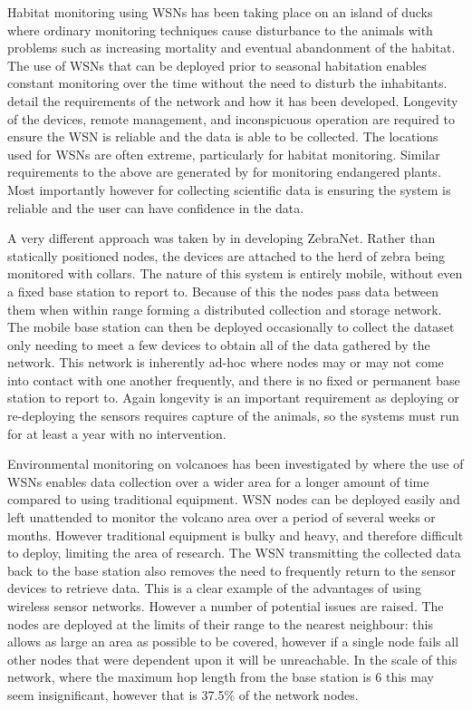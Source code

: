 \documentclass[authoryearcitations]{UoYCSproject}
\begin{document}
Habitat monitoring using WSNs has been taking place on an island of ducks where ordinary monitoring techniques cause disturbance to the animals with problems such as increasing mortality and eventual abandonment of the habitat. The use of WSNs that can be deployed prior to seasonal habitation enables constant monitoring over the time without the need to disturb the inhabitants. \citet{Mainwaring2002} detail the requirements of the network and how it has been developed. Longevity of the devices, remote management, and inconspicuous operation are required to ensure the WSN is reliable and the data is able to be collected. The locations used for WSNs are often extreme, particularly for habitat monitoring. Similar requirements to the above are generated by \citet{Biagioni2002} for monitoring endangered plants. Most importantly however for collecting scientific data is ensuring the system is reliable and the user can have confidence in the data.


A very different approach was taken by \citet{Juang2002} in developing ZebraNet. Rather than statically positioned nodes, the devices are attached to the herd of zebra being monitored with collars. The nature of this system is entirely mobile, without even a fixed base station to report to. Because of this the nodes pass data between them when within range forming a distributed collection and storage network. The mobile base station can then be deployed occasionally to collect the dataset only needing to meet a few devices to obtain all of the data gathered by the network. This network is inherently ad-hoc where nodes may or may not come into contact with one another frequently, and there is no fixed or permanent base station to report to. Again longevity is an important requirement as deploying or re-deploying the sensors requires capture of the animals, so the systems must run for at least a year with no intervention.

Environmental monitoring on volcanoes has been investigated by \citet{Werner-Allen2006} where the use of WSNs enables data collection over a wider area for a longer amount of time compared to using traditional equipment. WSN nodes can be deployed easily and left unattended to monitor the volcano area over a period of several weeks or months. However traditional equipment is bulky and heavy, and therefore difficult to deploy, limiting the area of research. The WSN transmitting the collected data back to the base station also removes the need to frequently return to the sensor devices to retrieve data. This is a clear example of the advantages of using wireless sensor networks. However a number of potential issues are raised. The nodes are deployed at the limits of their range to the nearest neighbour: this allows as large an area as possible to be covered, however if a single node fails all other nodes that were dependent upon it will be unreachable. In the scale of this network, where the maximum hop length from the base station is 6 this may seem insignificant, however that is 37.5\% of the network nodes.
\end{document}
